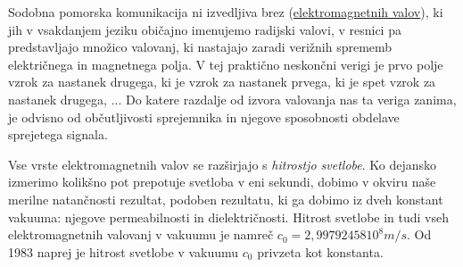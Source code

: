 
Sodobna pomorska komunikacija ni izvedljiva brez (\href{http://missionscience.nasa.gov/ems/05_radiowaves.html}{elektromagnetnih valov}), ki jih v vsakdanjem jeziku običajno imenujemo radijski valovi, v resnici pa predstavljajo množico valovanj, ki nastajajo zaradi verižnih sprememb električnega in magnetnega polja. V tej praktično neskončni verigi je prvo polje vzrok za nastanek drugega, ki je vzrok za nastanek prvega, ki je spet vzrok za nastanek drugega, ... Do katere razdalje od izvora valovanja nas ta veriga zanima, je odvisno od občutljivosti sprejemnika in njegove sposobnosti obdelave sprejetega signala.

Vse vrste elektromagnetnih valov se razširjajo s \textit{hitrostjo svetlobe}. Ko dejansko izmerimo kolikšno pot prepotuje svetloba v eni sekundi, dobimo v okviru naše merilne natančnosti rezultat, podoben rezultatu, ki ga dobimo iz dveh konstant vakuuma: njegove permeabilnosti in dielektričnosti. Hitrost svetlobe in tudi vseh elektromagnetnih valovanj v vakuumu je namreč $c_0 = 2,99792458 10^8m/s$. Od 1983 naprej je hitrost svetlobe v vakuumu $c_0$ privzeta kot konstanta.

